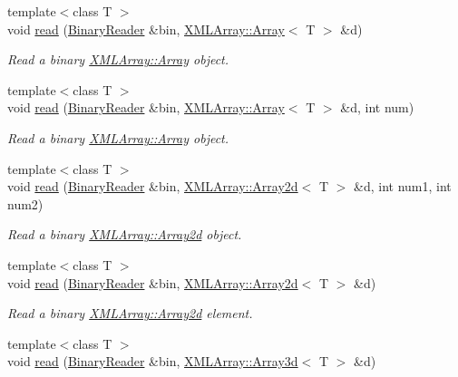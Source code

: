 \begin{DoxyCompactItemize}
{\footnotesize template$<$class T $>$ }\\void \mbox{\hyperlink{namespaceADATIO_a16a912dec3b1d1424a44c9f1a6cd915f}{read}} (\mbox{\hyperlink{classADATIO_1_1BinaryReader}{Binary\+Reader}} \&bin, \mbox{\hyperlink{classXMLArray_1_1Array}{X\+M\+L\+Array\+::\+Array}}$<$ T $>$ \&d)
\begin{DoxyCompactList}\small\item\em Read a binary \mbox{\hyperlink{classXMLArray_1_1Array}{X\+M\+L\+Array\+::\+Array}} object. \end{DoxyCompactList}\item 
{\footnotesize template$<$class T $>$ }\\void \mbox{\hyperlink{namespaceADATIO_a2a2a1e3d909d72f5e64dcded1bdb8012}{read}} (\mbox{\hyperlink{classADATIO_1_1BinaryReader}{Binary\+Reader}} \&bin, \mbox{\hyperlink{classXMLArray_1_1Array}{X\+M\+L\+Array\+::\+Array}}$<$ T $>$ \&d, int num)
\begin{DoxyCompactList}\small\item\em Read a binary \mbox{\hyperlink{classXMLArray_1_1Array}{X\+M\+L\+Array\+::\+Array}} object. \end{DoxyCompactList}\item 
{\footnotesize template$<$class T $>$ }\\void \mbox{\hyperlink{namespaceADATIO_ab767ead2d172e8ecf85663edea909002}{read}} (\mbox{\hyperlink{classADATIO_1_1BinaryReader}{Binary\+Reader}} \&bin, \mbox{\hyperlink{classXMLArray_1_1Array2d}{X\+M\+L\+Array\+::\+Array2d}}$<$ T $>$ \&d, int num1, int num2)
\begin{DoxyCompactList}\small\item\em Read a binary \mbox{\hyperlink{classXMLArray_1_1Array2d}{X\+M\+L\+Array\+::\+Array2d}} object. \end{DoxyCompactList}\item 
{\footnotesize template$<$class T $>$ }\\void \mbox{\hyperlink{namespaceADATIO_a9a2262a21e8dd6377d669f96ef9276b9}{read}} (\mbox{\hyperlink{classADATIO_1_1BinaryReader}{Binary\+Reader}} \&bin, \mbox{\hyperlink{classXMLArray_1_1Array2d}{X\+M\+L\+Array\+::\+Array2d}}$<$ T $>$ \&d)
\begin{DoxyCompactList}\small\item\em Read a binary \mbox{\hyperlink{classXMLArray_1_1Array2d}{X\+M\+L\+Array\+::\+Array2d}} element. \end{DoxyCompactList}\item 
{\footnotesize template$<$class T $>$ }\\void \mbox{\hyperlink{namespaceADATIO_ac8f475cc894abb16b89f3e73e1132bce}{read}} (\mbox{\hyperlink{classADATIO_1_1BinaryReader}{Binary\+Reader}} \&bin, \mbox{\hyperlink{classXMLArray_1_1Array3d}{X\+M\+L\+Array\+::\+Array3d}}$<$ T $>$ \&d)

\end{DoxyCompactItemize}
